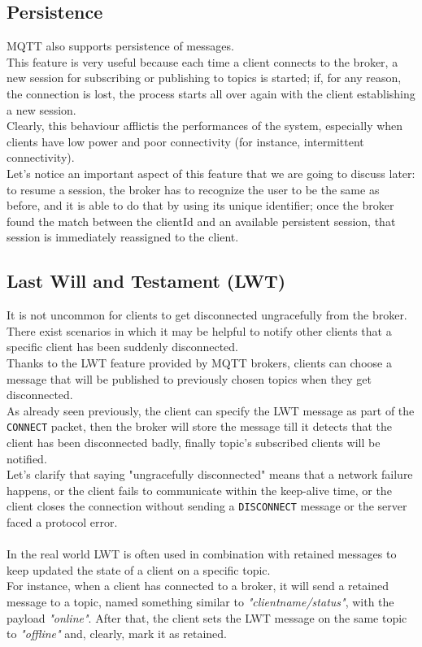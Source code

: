 \documentclass[12pt]{report}
\begin{document}
{\subsection{Persistence}
\bigskip
MQTT also supports persistence of messages.\\
This feature is very useful because each time a client connects to the broker, a new session for subscribing or publishing to topics is started; if, for any reason, the connection is lost, the process starts all over again with the client establishing a new session.\\
Clearly, this behaviour afflictis the performances of the system, especially when clients have low power and poor connectivity (for instance, intermittent connectivity).\\
Let's notice an important aspect of this feature that we are going to discuss later: to resume a session, the broker has to recognize the user to be the same as before, and it is able to do that by using its unique identifier; once the broker found the match between the clientId and an available persistent session, that session is immediately reassigned to the client.\\

\subsection{Last Will and Testament (LWT)}
\bigskip
It is not uncommon for clients to get disconnected ungracefully from the broker.\\
There exist scenarios in which it may be helpful to notify other clients that a specific client has been suddenly disconnected.\\
Thanks to the LWT feature provided by MQTT brokers, clients can choose a message that will be published to previously chosen topics when they get disconnected.\\
As already seen previously, the client can specify the LWT message as part of the \texttt{CONNECT} packet, then the broker will store the message till it detects that the client has been disconnected badly, finally topic's subscribed clients will be notified.\\
Let's clarify that saying "ungracefully disconnected" means that a network failure happens, or the client fails to communicate within the keep-alive time, or the client closes the connection without sending a \texttt{DISCONNECT} message or the server faced a protocol error.\\\\
In the real world LWT is often used in combination with retained messages to keep updated the state of a client on a specific topic.\\
For instance, when a client has connected to a broker, it will send a retained message to a topic, named something similar to \textit{"clientname/status"}, with the payload \textit{"online"}.
After that, the client sets the LWT message on the same topic to \textit{"offline"} and, clearly, mark it as retained.



}
\end{document}
